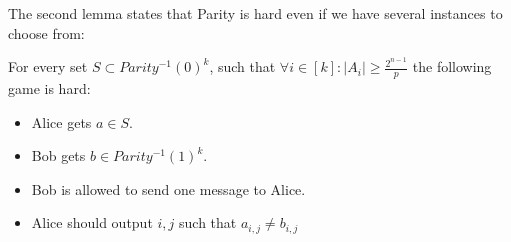The second lemma states that Parity is hard even if we have several instances to choose from:

\begin{lemma}
    For every set $S \subset Parity^{-1}(0)^k$, such that $\forall i \in [k]: |A_i| \geq \frac{2^{n-1}}{p}$ the following game is hard:
    
    \begin{itemize}
        \item Alice gets $a \in S$.
        
        \item Bob gets $b \in Parity^{-1}(1)^k$.
        
        \item Bob is allowed to send one message to Alice.
        
        \item Alice should output $i,j$ such that $a_{i,j} \neq b_{i,j}$
    \end{itemize}
    
    
\end{lemma}
